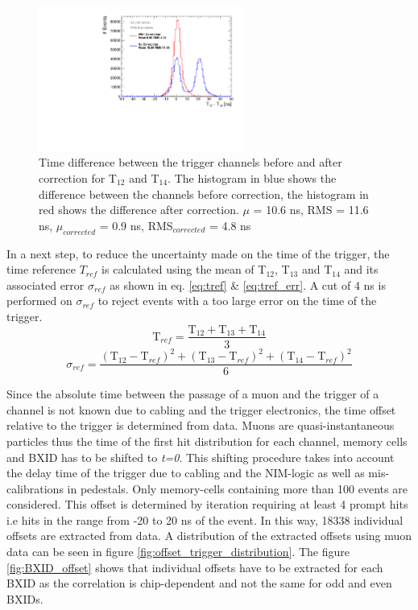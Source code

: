 \documentclass[twoside,a4paper,11pt]{article}
\begin{document}
\begin{figure}[htbp]
\begin{center}
\includegraphics[width=0.6\textwidth]{fig/T0s/T0_Resolution_5.pdf}
\caption{Time difference between the trigger channels before and after correction for T$_{12}$ and T$_{14}$. The histogram in blue shows the difference between the channels before correction, the histogram in red shows the difference after correction. $\mu$ = 10.6 ns, RMS = 11.6 ns, $\mu_{corrected}$ = 0.9 ns, RMS$_{corrected}$ = 4.8 ns}
\label{fig:T0_Correction}
\end{center}
\end{figure}

In a next step, to reduce the uncertainty made on the time of the trigger, the time reference $T_{ref}$ is calculated using the mean of T$_{12}$, T$_{13}$ and T$_{14}$ and its associated error $\sigma_{ref}$ as shown in eq. \ref{eq:tref} \& \ref{eq:tref_err}. A cut of 4 ns is performed on $\sigma_{ref}$ to reject events with a too large error on the time of the trigger.
\begin{equation} \label{eq:tref}
\text{T}_{ref} = \frac{\text{T}_{12} + \text{T}_{13} + \text{T}_{14}}{3}
\end{equation}
\begin{equation} \label{eq:tref_err}
\sigma_{ref} = \frac{ (\text{T}_{12} - \text{T}_{ref})^2 + (\text{T}_{13} - \text{T}_{ref})^2  + (\text{T}_{14} - \text{T}_{ref})^2 }{6}
\end{equation}

Since the absolute time between the passage of a muon and the trigger of a channel is not known due to cabling and the trigger electronics, the time offset relative to the trigger is determined from data. Muons are quasi-instantaneous particles thus the time of the first hit distribution for each channel, memory cells and BXID has to be shifted to \textit{t=0}. This shifting procedure takes into account the delay time of the trigger due to cabling and the NIM-logic as well as mis-calibrations in pedestals. Only memory-cells containing more than 100 events are considered. This offset is determined by iteration requiring at least 4 prompt hits i.e hits in the range from -20 to 20 ns of the event. In this way, 18338 individual offsets are extracted from data. A distribution of the extracted offsets using muon data can be seen in figure \ref{fig:offset_trigger_distribution}. The figure \ref{fig:BXID_offset} shows that individual offsets have to be extracted for each BXID as the correlation is chip-dependent and not the same for odd and even BXIDs.
\end{document}
